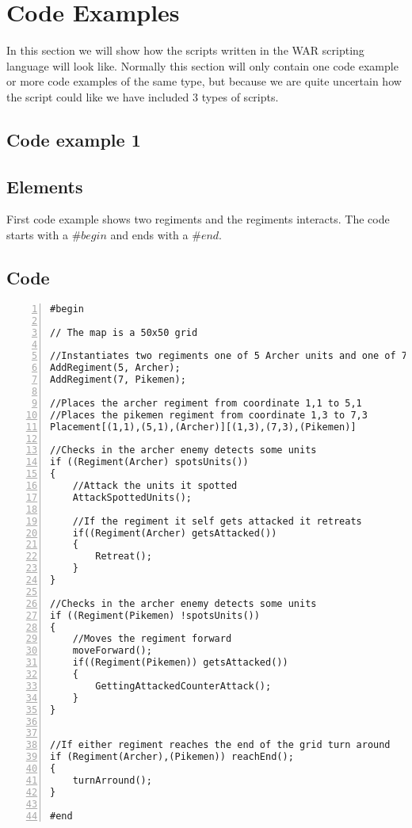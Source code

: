 \section{Code Examples}
	In this section we will show how the scripts written in the WAR scripting language will look like.
	Normally this section will only contain one code example or more code examples of the same type, 
	but because we are quite uncertain how the script could like we have included 3 types of scripts.
	\subsection{Code example 1}
		\subsection{Elements}
			First code example shows two regiments and the regiments interacts. The code starts with a $\#begin$ and ends with a $\#end$.
		\subsection{Code}
			\begin{lstlisting}[basicstyle=\small\sffamily,
				keywords={break,case,const,continue,default,else,enum,
				for,if,return,switch,while,do,long,void,int,float,double,
				char,struct,typedef,include,size\_t},
				keywordstyle={\color{blue}},
				comment={[l]{//}}, morecomment={[s]{/*}{*/}}, commentstyle=\itshape,
				columns={[l]flexible}, numbers=left, numberstyle=\tiny,
				frameround=fftt, frame=shadowbox, captionpos=b,
				caption={Code example 1},
				label=LST:code1]
#begin

// The map is a 50x50 grid

//Instantiates two regiments one of 5 Archer units and one of 7 Pikemen units:
AddRegiment(5, Archer);
AddRegiment(7, Pikemen);

//Places the archer regiment from coordinate 1,1 to 5,1
//Places the pikemen regiment from coordinate 1,3 to 7,3
Placement[(1,1),(5,1),(Archer)][(1,3),(7,3),(Pikemen)]

//Checks in the archer enemy detects some units
if ((Regiment(Archer) spotsUnits())
{
	//Attack the units it spotted
	AttackSpottedUnits();

	//If the regiment it self gets attacked it retreats
	if((Regiment(Archer) getsAttacked())
	{
		Retreat();
	}
}

//Checks in the archer enemy detects some units
if ((Regiment(Pikemen) !spotsUnits())
{
	//Moves the regiment forward	
	moveForward();
	if((Regiment(Pikemen)) getsAttacked())
	{
		GettingAttackedCounterAttack();
	}
}


//If either regiment reaches the end of the grid turn around
if (Regiment(Archer),(Pikemen)) reachEnd();
{
	turnArround();
}

#end

		 	\end{lstlisting}

